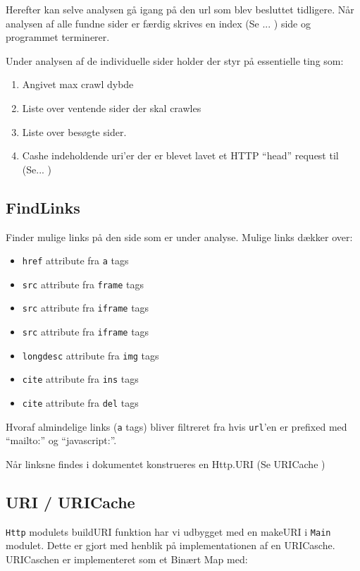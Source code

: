 \documentclass[a4paper,oneside,article]{memoir}
\begin{document}
Herefter kan selve analysen gå igang på den url som blev besluttet
tidligere.  Når analysen af alle fundne sider er færdig skrives en
index (Se ... ) side og programmet terminerer.


Under analysen af de individuelle sider holder der styr på essentielle ting som:

\begin{enumerate}
 \item Angivet max crawl dybde
 \item Liste over ventende sider der skal crawles
 \item Liste over besøgte sider.
 \item Cashe indeholdende uri'er der er blevet lavet et HTTP ``head'' request til (Se... )
\end{enumerate}

\subsection{FindLinks}
Finder mulige links på den side som er under analyse. Mulige links dækker over:

\begin{itemize}
 \item \texttt{href} attribute fra \texttt{a} tags
 \item \texttt{src} attribute fra \texttt{frame} tags
 \item \texttt{src} attribute fra \texttt{iframe} tags
 \item \texttt{src} attribute fra \texttt{iframe} tags
 \item \texttt{longdesc} attribute fra \texttt{img} tags
 \item \texttt{cite} attribute fra \texttt{ins} tags
 \item \texttt{cite} attribute fra \texttt{del} tags
\end{itemize}

Hvoraf almindelige links (\texttt{a} tags) bliver filtreret fra hvis
\texttt{url}'en er prefixed med ``mailto:'' og ``javascript:''.

Når linksne findes i dokumentet konstrueres en Http.URI (Se URICache )

\subsection{URI / URICache}

\texttt{Http} modulets buildURI funktion har vi udbygget med en
makeURI i \texttt{Main} modulet. Dette er gjort med henblik på
implementationen af en URICasche. URICaschen er implementeret som et
Binært Map med:
\end{document}

